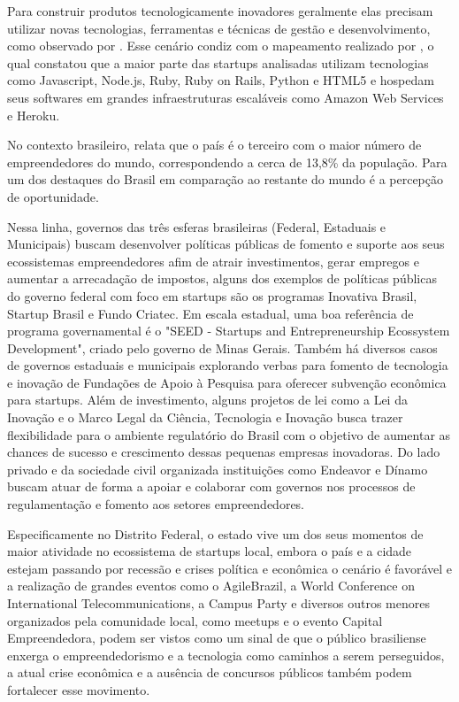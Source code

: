 Para construir produtos tecnologicamente inovadores geralmente elas precisam utilizar novas tecnologias, ferramentas e técnicas de gestão e desenvolvimento, como observado por . Esse cenário condiz com o mapeamento realizado por , o qual constatou que a maior parte das startups analisadas utilizam tecnologias como Javascript, Node.js, Ruby, Ruby on Rails, Python e HTML5 e hospedam seus softwares em grandes infraestruturas escaláveis como Amazon Web Services e Heroku. 

No contexto brasileiro,  relata que o país é o terceiro com o maior número de empreendedores do mundo, correspondendo a cerca de 13,8\% da população. Para  um dos destaques do Brasil em comparação ao restante do mundo é a percepção de oportunidade.

Nessa linha, governos das três esferas brasileiras (Federal, Estaduais e Municipais) buscam desenvolver políticas públicas de fomento e suporte aos seus ecossistemas empreendedores afim de atrair investimentos, gerar empregos e aumentar a arrecadação de impostos, alguns dos exemplos de políticas públicas do governo federal com foco em startups são os programas Inovativa Brasil, Startup Brasil e Fundo Criatec. Em escala estadual, uma boa referência de programa governamental é o "SEED - Startups and Entrepreneurship Ecossystem Development", criado pelo governo de Minas Gerais. Também há diversos casos de governos estaduais e municipais explorando verbas para fomento de tecnologia e inovação de Fundações de Apoio à Pesquisa para oferecer subvenção econômica para startups. Além de investimento, alguns projetos de lei como a Lei da Inovação e o Marco Legal da Ciência, Tecnologia e Inovação busca trazer flexibilidade para o ambiente regulatório do Brasil com o objetivo de aumentar as chances de sucesso e crescimento dessas pequenas empresas inovadoras. Do lado privado e da sociedade civil organizada instituições como Endeavor e Dínamo buscam atuar de forma a apoiar e colaborar com governos nos processos de regulamentação e fomento aos setores empreendedores.

Especificamente no Distrito Federal, o estado vive um dos seus momentos de maior atividade no ecossistema de startups local, embora o país e a cidade estejam passando por recessão e crises política e econômica o cenário é favorável e a realização de grandes eventos como o AgileBrazil, a World Conference on International Telecommunications, a Campus Party e diversos outros menores organizados pela comunidade local, como meetups e o evento Capital Empreendedora, podem ser vistos como um sinal de que o público brasiliense enxerga o empreendedorismo e a tecnologia como caminhos a serem perseguidos, a atual crise econômica e a ausência de concursos públicos também podem fortalecer esse movimento.

